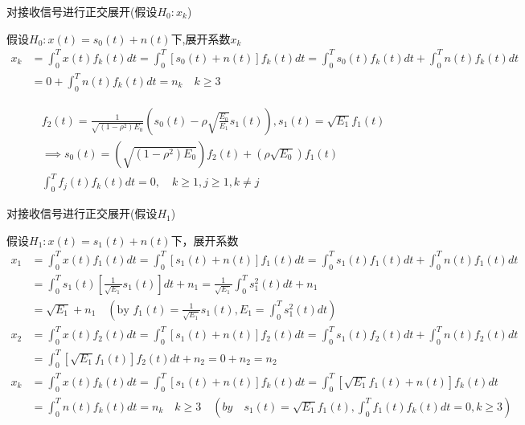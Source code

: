 \begin{frame}[shrink]{对接收信号进行正交展开(假设$H_0: x_k$)}
\begin{block}{假设$H_0:x(t)=s_0(t)+n(t)$下,展开系数$x_k$}
	\begin{align*}
	x_k&=\int_{0}^{T}x(t)f_k(t)dt=\int_{0}^{T}[s_0(t)+n(t)]f_k(t)dt=\int_{0}^{T}s_0(t)f_k(t)dt+\int_{0}^{T}n(t)f_k(t)dt\\
	&=0+\int_{0}^{T}n(t)f_k(t)dt=n_k\quad k\ge 3
	\end{align*}
\end{block}
\begin{align*}
&f_2(t)=\frac{1}{\sqrt{(1-\rho^2)E_0}}\left(s_0(t)-\rho\sqrt{\frac{E_0}{E_1}}s_1(t)\right), s_1(t)=\sqrt{E_1}f_1(t)\\
&\implies s_0(t)=\left(\sqrt{(1-\rho^2)E_0}\right)f_2(t)+\left(\rho\sqrt{E_0}\right)f_1(t)\\
&\int_{0}^{T}f_j(t)f_k(t)dt=0,\quad k\ge 1, j\ge 1, k\ne j
\end{align*}
\end{frame}

\begin{frame}[shrink]{对接收信号进行正交展开(假设$H_1$)}
\begin{block}{假设$H_1:x(t)=s_1(t)+n(t)$下，展开系数}
\begin{align*}
	x_1&=\int_{0}^{T}x(t)f_1(t)dt=\int_{0}^{T}[s_1(t)+n(t)]f_1(t)dt=\int_{0}^{T}s_1(t)f_1(t)dt+\int_{0}^{T}n(t)f_1(t)dt\\
	&=\int_{0}^{T}s_1(t)[\frac{1}{\sqrt{E_1}}s_1(t)]dt+n_1=\frac{1}{\sqrt{E_1}}\int_{0}^{T}s_1^2(t)dt+n_1\\
	&=\sqrt{E_1}+n_1\quad (\text{by }f_1(t)=\frac{1}{\sqrt{E_1}}s_1(t),E_1=\int_{0}^{T}s_1^2(t)dt)\\
	x_2&=\int_{0}^{T}x(t)f_2(t)dt=\int_{0}^{T}[s_1(t)+n(t)]f_2(t)dt=\int_{0}^{T}s_1(t)f_2(t)dt+\int_{0}^{T}n(t)f_2(t)dt\\
	&=\int_{0}^{T}[\sqrt{E_1}f_1(t)]f_2(t)dt+n_2=0+n_2=n_2\\
	x_k&=\int_{0}^{T}x(t)f_k(t)dt=\int_{0}^{T}[s_1(t)+n(t)]f_k(t)dt=\int_{0}^{T}[\sqrt{E_1}f_1(t)+n(t)]f_k(t)dt\\
	&=\int_{0}^{T}n(t)f_k(t)dt=n_k\quad k\ge 3\quad (by\quad s_1(t)=\sqrt{E_1}f_1(t), \int_{0}^{T}f_1(t)f_k(t)dt=0,k\ge 3)
\end{align*}
\end{block}
\end{frame}

